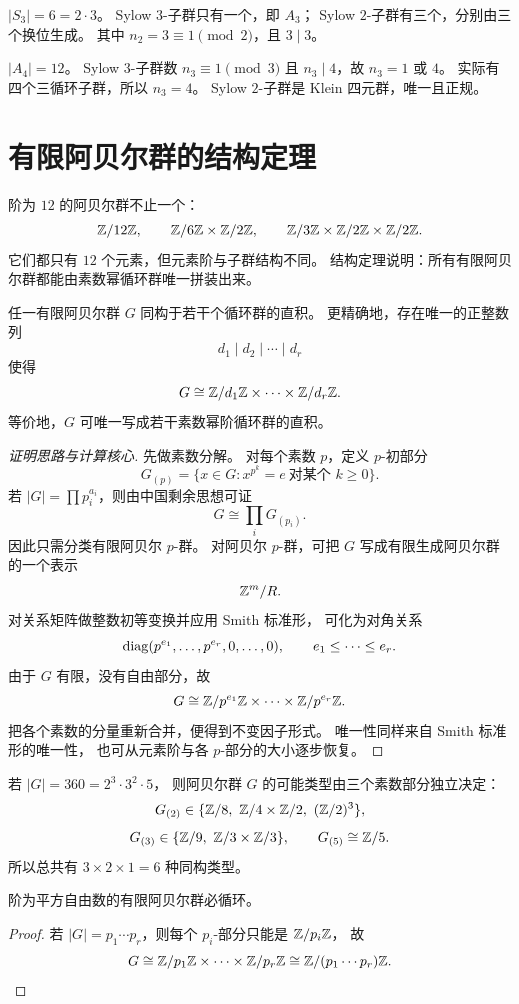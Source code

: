 \begin{example}
$|S_3|=6=2\cdot3$。
Sylow $3$-子群只有一个，即 $A_3$；
Sylow $2$-子群有三个，分别由三个换位生成。
其中 $n_2=3\equiv1\pmod2$，且 $3\mid3$。
\end{example}
\begin{example}
$|A_4|=12$。
Sylow $3$-子群数 $n_3\equiv1\pmod3$ 且 $n_3\mid4$，故 $n_3=1$ 或 $4$。
实际有四个三循环子群，所以 $n_3=4$。
Sylow $2$-子群是 Klein 四元群，唯一且正规。
\end{example}
\section{有限阿贝尔群的结构定理}
\begin{example}
阶为 $12$ 的阿贝尔群不止一个：
\[
\mathbb{Z}/12\mathbb{Z},\qquad \mathbb{Z}/6\mathbb{Z}\times\mathbb{Z}/2\mathbb{Z},\qquad \mathbb{Z}/3\mathbb{Z}\times\mathbb{Z}/2\mathbb{Z}\times\mathbb{Z}/2\mathbb{Z}.
\]
它们都只有 $12$ 个元素，但元素阶与子群结构不同。
结构定理说明：所有有限阿贝尔群都能由素数幂循环群唯一拼装出来。
\end{example}
\begin{theorem}[有限阿贝尔群结构定理]
任一有限阿贝尔群 $G$ 同构于若干个循环群的直积。
更精确地，存在唯一的正整数列
\[
 d_1\mid d_2\mid\cdots\mid d_r
\]
使得
\[
 G\cong \mathbb{Z}/d_1\mathbb{Z}\times\cdots\times \mathbb{Z}/d_r\mathbb{Z}.
\]
等价地，$G$ 可唯一写成若干素数幂阶循环群的直积。
\end{theorem}
\begin{proof}[证明思路与计算核心]
先做素数分解。
对每个素数 $p$，定义 $p$-初部分
\[
G_{(p)}=\{x\in G:x^{p^k}=e\ \text{对某个 }k\ge0\}.
\]
若 $|G|=\prod p_i^{a_i}$，则由中国剩余思想可证
\[
G\cong \prod_i G_{(p_i)}.
\]
因此只需分类有限阿贝尔 $p$-群。
对阿贝尔 $p$-群，可把 $G$ 写成有限生成阿贝尔群的一个表示
\[
\mathbb{Z}^m/R.
\]
对关系矩阵做整数初等变换并应用 Smith 标准形，
可化为对角关系
\[
\mathrm{diag}(p^{e_1},\dots,p^{e_r},0,\dots,0),
\qquad e_1\le\cdots\le e_r.
\]
由于 $G$ 有限，没有自由部分，故
\[
G\cong \mathbb{Z}/p^{e_1}\mathbb{Z}\times\cdots\times\mathbb{Z}/p^{e_r}\mathbb{Z}.
\]
把各个素数的分量重新合并，便得到不变因子形式。
唯一性同样来自 Smith 标准形的唯一性，
也可从元素阶与各 $p$-部分的大小逐步恢复。
\end{proof}
\begin{example}
若 $|G|=360=2^3\cdot3^2\cdot5$，
则阿贝尔群 $G$ 的可能类型由三个素数部分独立决定：
\[
G_{(2)}\in\{\Z/8,\ \Z/4\times\Z/2,\ (\Z/2)^3\},
\]
\[
G_{(3)}\in\{\Z/9,\ \Z/3\times\Z/3\},
\qquad
G_{(5)}\cong\Z/5.
\]
所以总共有 $3\times2\times1=6$ 种同构类型。
\end{example}
\begin{corollary}
阶为平方自由数的有限阿贝尔群必循环。
\end{corollary}
\begin{proof}
若 $|G|=p_1\cdots p_r$，则每个 $p_i$-部分只能是 $\mathbb{Z}/p_i\mathbb{Z}$，
故
\[
G\cong \mathbb{Z}/p_1\mathbb{Z}\times\cdots\times\mathbb{Z}/p_r\mathbb{Z}\cong \mathbb{Z}/(p_1\cdots p_r)\mathbb{Z}.
\]
\end{proof}
